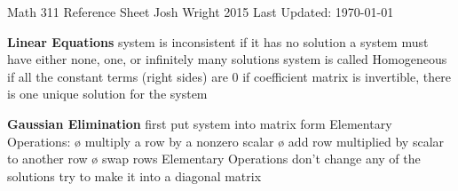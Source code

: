 \documentclass[12pt]{article}
\begin{document}
\begin{center}
Math 311 Reference Sheet
\hfill \textcopyright{} Josh Wright 2015 \hfill
Last Updated: \today
\end{center}

\begin{multicols*}{2}
\begin{flushleft}
\begin{outline}[longenum]

\newlength{\upspacelength}
\setlength{\upspacelength}{0px}
\newcommand{\upspace}{\vspace{\upspacelength}}
\newcommand{\zzz}[1]{\upspace\0 \textbf{#1} }
\let\oldOne\1\let\oldTwo\2\let\oldThree\3\let\oldFour\4
\renewcommand{\1}{\upspace{}\oldOne{}}
\renewcommand{\2}{\upspace\o{}\oldTwo{}}
\renewcommand{\3}{\upspace\o{}\oldThree{}}
\renewcommand{\4}{\upspace\o{}\oldFour{}}

\zzz{Linear Equations}
  \1 system is inconsistent if it has no solution
  \1 a system must have either none, one, or infinitely many solutions
  \1 system is called Homogeneous if all the constant terms (right sides) are 0
  \1 if coefficient matrix is invertible, there is one unique solution for the system

\zzz{Gaussian Elimination}
  \1 first put system into matrix form
  \1 Elementary Operations:
    \2 multiply a row by a nonzero scalar
    \2 add row multiplied by scalar to another row
    \2 swap rows
  \1 Elementary Operations don't change any of the solutions
  \1 try to make it into a diagonal matrix


\end{outline}
\end{flushleft}
\end{multicols*}
\end{document}
